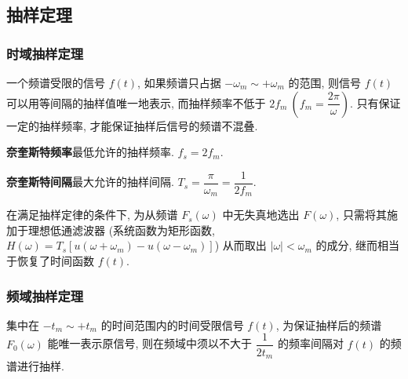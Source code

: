 \subsection{抽样定理} \label{3 抽样定理}
\subsubsection{时域抽样定理}
一个频谱受限的信号 $f(t)$, 如果频谱只占据 $-\omega_m\sim+\omega_m$ 的范围, 则信号 $f(t)$ 可以用等间隔的抽样值唯一地表示, 而抽样频率不低于 $2f_m\ \left(f_m=\dfrac{2\pi}{\omega}\right)$. 只有保证一定的抽样频率, 才能保证抽样后信号的频谱不混叠.

\textbf{奈奎斯特频率}\quad 最低允许的抽样频率. $f_s=2f_m$.

\textbf{奈奎斯特间隔}\quad 最大允许的抽样间隔. $T_s=\dfrac{\pi}{\omega_m}=\dfrac{1}{2f_m}$.

在满足抽样定律的条件下, 为从频谱 $F_s(\omega)$ 中无失真地选出 $F(\omega)$, 只需将其施加于理想低通滤波器 (系统函数为矩形函数, $H(\omega)=T_s[u(\omega+\omega_m)-u(\omega-\omega_m)]$) 从而取出 $|\omega|<\omega_m$ 的成分, 继而相当于恢复了时间函数 $f(t)$.

\subsubsection{频域抽样定理}
集中在 $-t_m\sim+t_m$ 的时间范围内的时间受限信号 $f(t)$, 为保证抽样后的频谱 $F_0(\omega)$ 能唯一表示原信号, 则在频域中须以不大于 $\dfrac{1}{2t_m}$ 的频率间隔对 $f(t)$ 的频谱进行抽样.

